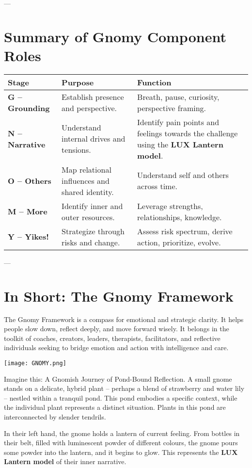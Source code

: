 \documentclass{article}
\begin{document}
---

\section{Summary of Gnomy Component Roles}
\begin{tabular}{|p{}|p{}|p{}|}
    \hline
    \textbf{Stage} & \textbf{Purpose} & \textbf{Function} \\
    \hline
    \textbf{G – Grounding} & Establish presence and perspective. & Breath, pause, curiosity, perspective framing. \\
    \textbf{N – Narrative} & Understand internal drives and tensions. & Identify pain points and feelings towards the challenge using the \textbf{LUX Lantern model}. \\
    \textbf{O – Others} & Map relational influences and shared identity. & Understand self and others across time. \\
    \textbf{M – More} & Identify inner and outer resources. & Leverage strengths, relationships, knowledge. \\
    \textbf{Y – Yikes!} & Strategize through risks and change. & Assess risk spectrum, derive action, prioritize, evolve. \\
    \hline
\end{tabular}

---

\section{In Short: The Gnomy Framework}
The Gnomy Framework is a compass for emotional and strategic clarity. It helps people slow down, reflect deeply, and move forward wisely. It belongs in the toolkit of coaches, creators, leaders, therapists, facilitators, and reflective individuals seeking to bridge emotion and action with intelligence and care.
\begin{center}
\texttt{[image: GNOMY.png]}
\end{center}
Imagine this: A Gnomish Journey of Pond-Bound Reflection. A small gnome stands on a delicate, hybrid plant – perhaps a blend of strawberry and water lily – nestled within a tranquil pond. This pond embodies a specific context, while the individual plant represents a distinct situation. Plants in this pond are interconnected by slender tendrils.

In their left hand, the gnome holds a lantern of current feeling. From bottles in their belt, filled with luminescent powder of different colours, the gnome pours some powder into the lantern, and it begins to glow. This represents the \textbf{LUX Lantern model} of their inner narrative.
\end{document}
